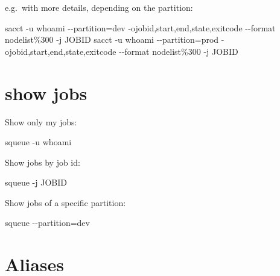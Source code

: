 \documentclass[
]{report}
\newenvironment{Shaded}{\begin{snugshade}}{\end{snugshade}}
\newcommand{\AttributeTok}[1]{\textcolor[rgb]{0.40,0.45,0.13}{#1}}
\newcommand{\ExtensionTok}[1]{\textcolor[rgb]{0.00,0.23,0.31}{#1}}
\newcommand{\FunctionTok}[1]{\textcolor[rgb]{0.28,0.35,0.67}{#1}}
\newcommand{\KeywordTok}[1]{\textcolor[rgb]{0.00,0.23,0.31}{#1}}
\newcommand{\NormalTok}[1]{\textcolor[rgb]{0.00,0.23,0.31}{#1}}
\newcommand{\OperatorTok}[1]{\textcolor[rgb]{0.37,0.37,0.37}{#1}}
\begin{document}
e.g.~with more details, depending on the partition:

\begin{Shaded}
\begin{Highlighting}[]
\ExtensionTok{sacct} \AttributeTok{{-}u} \KeywordTok{\textasciigrave{}}\FunctionTok{whoami}\KeywordTok{\textasciigrave{}} \AttributeTok{{-}{-}partition}\OperatorTok{=}\NormalTok{dev  }\AttributeTok{{-}ojobid,start,end,state,exitcode} \AttributeTok{{-}{-}format}\NormalTok{ nodelist\%300  }\AttributeTok{{-}j}\NormalTok{ JOBID}
\ExtensionTok{sacct} \AttributeTok{{-}u} \KeywordTok{\textasciigrave{}}\FunctionTok{whoami}\KeywordTok{\textasciigrave{}} \AttributeTok{{-}{-}partition}\OperatorTok{=}\NormalTok{prod }\AttributeTok{{-}ojobid,start,end,state,exitcode} \AttributeTok{{-}{-}format}\NormalTok{ nodelist\%300  }\AttributeTok{{-}j}\NormalTok{ JOBID}
\end{Highlighting}
\end{Shaded}

\section{show jobs}\label{show-jobs}

Show only my jobs:

\begin{Shaded}
\begin{Highlighting}[]
\ExtensionTok{squeue} \AttributeTok{{-}u} \KeywordTok{\textasciigrave{}}\FunctionTok{whoami}\KeywordTok{\textasciigrave{}}
\end{Highlighting}
\end{Shaded}

Show jobs by job id:

\begin{Shaded}
\begin{Highlighting}[]
\ExtensionTok{squeue} \AttributeTok{{-}j}\NormalTok{ JOBID}
\end{Highlighting}
\end{Shaded}

Show jobs of a specific partition:

\begin{Shaded}
\begin{Highlighting}[]
\ExtensionTok{squeue} \AttributeTok{{-}{-}partition}\OperatorTok{=}\NormalTok{dev}
\end{Highlighting}
\end{Shaded}

\section{Aliases}\label{aliases}
\end{document}
